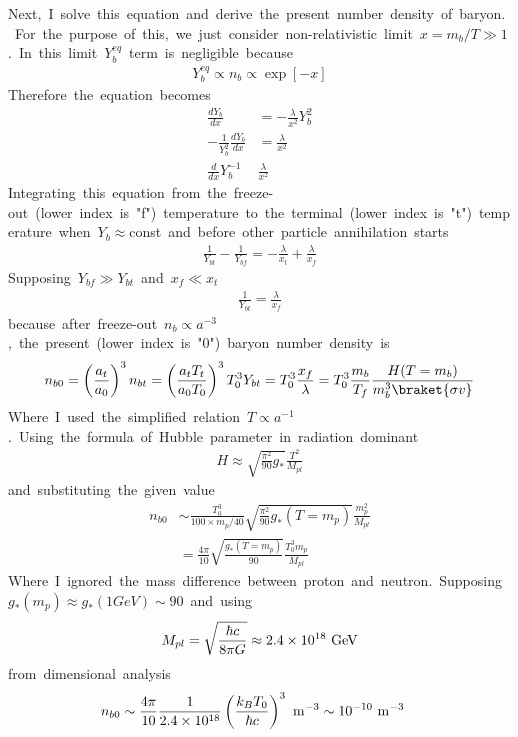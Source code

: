 Next,\ I\ solve\ this\ equation\ and\ derive\ the\ present\ number\ density\ of\ baryon.\ For\ the\ purpose\ of\ this,\ we\ just\ consider\ non-relativistic\ limit\ $x=m_b/T\gg1$.\ In\ this\ limit\ $Y_b^{eq}$\ term\ is\ negligible\ because
\begin{align*}
    Y_b^{eq}\propto n_b\propto\exp[-x]
\end{align*}
Therefore\ the\ equation\ becomes
\begin{align*}
    \frac{dY_b}{dx}&=-\frac{\lambda}{x^2}Y_b^2\\
    -\frac{1}{Y_b^2}\frac{dY_b}{dx}&=\frac{\lambda}{x^2}\\
    \frac{d}{dx}Y_b^{-1}&\frac{\lambda}{x^2}
\end{align*}
Integrating\ this\ equation\ from\ the\ freeze-out\ (lower\ index\ is\ "f")\ temperature\ to\ the\ terminal\ (lower\ index\ is\ "t")\ temperature\ when\ $Y_b\approx$const\ and\ before\ other\ particle\ annihilation\ starts
\begin{align*}
    \frac{1}{Y_{bt}}-\frac{1}{Y_{bf}}=-\frac{\lambda}{x_t}+\frac{\lambda}{x_f}
\end{align*}
Supposing\ $Y_{bf}\gg Y_{bt}$\ and\ $x_f\ll x_t$
\begin{align*}
    \frac{1}{Y_{bt}}=\frac{\lambda}{x_f}
\end{align*}
because\ after\ freeze-out\ $n_b\propto a^{-3}$,\ the\ present\ (lower\ index\ is\ "0")\ baryon\ number\ density\ is
\begin{align*}
    n_{b0}=\left(\frac{a_t}{a_0}\right)^3n_{bt}=\left(\frac{a_tT_t}{a_0T_0}\right)^3T_0^3Y_{bt}=T_{0}^3\frac{x_f}{\lambda}=T^3_0\frac{m_b}{T_f}\frac{H(T=m_b)}{m_b^3\braket{\sigma v}}
\end{align*}
Where\ I\ used\ the\ simplified\ relation\ $T\propto a^{-1}$.\ Using\ the\ formula\ of\ Hubble\ parameter\ in\ radiation\ dominant
\begin{align*}
    H\approx\sqrt{\frac{\pi^2}{90}g_*}\frac{T^2}{M_{pl}}
\end{align*}
and\ substituting\ the\ given\ value
\begin{align*}
    n_{b0}&\sim \frac{T^3_0}{100\times m_p/40}\sqrt{\frac{\pi^2}{90}g_*(T=m_p)}\frac{m_p^2}{M_{pl}}\\
    &=\frac{4\pi}{10}\sqrt{\frac{g_*(T=m_p)}{90}}\frac{T^3_0m_p}{M_{pl}}
\end{align*}
Where\ I\ ignored\ the\ mass\ difference\ between\ proton\ and\ neutron.\ Supposing\ $g_*(m_p)\approx g_*(1GeV)\sim90$\ and\ using
\begin{align*}
    M_{pl}=\sqrt{\frac{\hbar c}{8\pi G}}\approx2.4\times10^{18}\ \rm{GeV}
\end{align*}
from\ dimensional\ analysis
\begin{align}
    n_{b0}&\sim\frac{4\pi}{10}\frac{1}{2.4\times10^{18}}\left(\frac{k_BT_0}{\hbar c}\right)^3\ \rm{m^{-3}}\sim10^{-10}\ \rm{m^{-3}}
\end{align}

